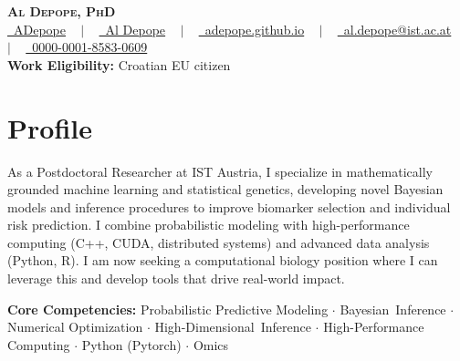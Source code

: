 \documentclass[a4paper,11pt]{article}
\begin{document}
\pagestyle{empty} 
\pagestyle{fancy}

\begin{center}
    \Huge{\textbf{\textsc{Al Depope, PhD}}} \\[12pt]
    \small{
        \href{https://github.com/ADepope}{\raisebox{-0.1\height}\faGithub\ ADepope} ~ $|$ ~ 
        \href{https://www.linkedin.com/in/al-depope/}{\raisebox{-0.1\height}\faLinkedin\ Al Depope} ~ $|$ ~ 
        \href{https://adepope.github.io}{\raisebox{-0.1\height}\faGlobe \ adepope.github.io} ~ $|$ ~ 
        \href{mailto:al.depope@ist.ac.at}{\raisebox{-0.1\height}\faEnvelope \ al.depope@ist.ac.at} ~ $|$ ~ 
        \href{https://orcid.org/0000-0001-8583-0609}{\raisebox{-0.1\height}\faOrcid\ 0000-0001-8583-0609}
    } \\[5pt]
    \small{\textbf{Work Eligibility:} Croatian EU citizen}
\end{center}

\section{Profile}

{\setlength{\emergencystretch}{3em}   \noindent  
As a Postdoctoral Researcher at IST Austria, I specialize in mathematically grounded machine learning and statistical genetics, developing novel Bayesian models and inference procedures to improve biomarker selection and individual risk prediction. I combine probabilistic modeling with high-performance computing (C++, CUDA, distributed systems) and advanced data analysis (Python, R). I am now seeking a computational biology position where I can leverage this and develop tools that drive real-world impact.
\par} 

\vspace{5pt}

{\setlength{\emergencystretch}{3em}    \noindent \textbf{Core Competencies:} Probabilistic Predictive Modeling $\cdot$ Bayesian~Inference $\cdot$ Numerical Optimization $\cdot$ High-Dimensional~Inference $\cdot$ High-Performance Computing $\cdot$ Python (Pytorch) $\cdot$ Omics \par}

\end{document}
